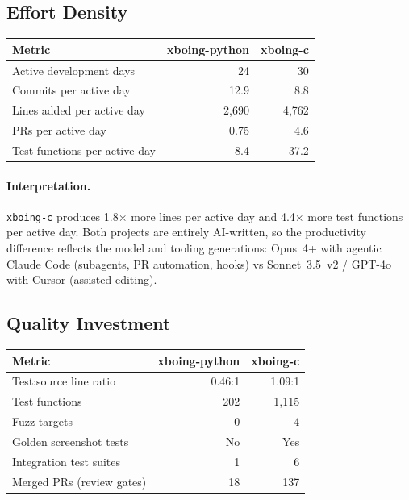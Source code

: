 \documentclass[a4paper,10pt]{article}
\newcommand{\repo}[1]{\texttt{#1}}
\begin{document}
\subsection{Effort Density}

\begin{center}
\begin{tabular}{@{}lrr@{}}
\toprule
\textbf{Metric} & \textbf{xboing-python} & \textbf{xboing-c} \\
\midrule
Active development days & 24 & 30 \\
Commits per active day & 12.9 & 8.8 \\
Lines added per active day & 2,690 & 4,762 \\
PRs per active day & 0.75 & 4.6 \\
Test functions per active day & 8.4 & 37.2 \\
\bottomrule
\end{tabular}
\end{center}

\paragraph{Interpretation.}  \repo{xboing-c} produces 1.8$\times$
more lines per active day and 4.4$\times$ more test functions per
active day.  Both projects are entirely AI-written, so the
productivity difference reflects the model and tooling generations:
Opus~4+ with agentic Claude Code (subagents, PR automation, hooks)
vs Sonnet~3.5~v2 / GPT-4o with Cursor (assisted editing).

\subsection{Quality Investment}

\begin{center}
\begin{tabular}{@{}lrr@{}}
\toprule
\textbf{Metric} & \textbf{xboing-python} & \textbf{xboing-c} \\
\midrule
Test:source line ratio & 0.46:1 & 1.09:1 \\
Test functions & 202 & 1,115 \\
Fuzz targets & 0 & 4 \\
Golden screenshot tests & No & Yes \\
Integration test suites & 1 & 6 \\
Merged PRs (review gates) & 18 & 137 \\
\bottomrule
\end{tabular}
\end{center}
\end{document}
